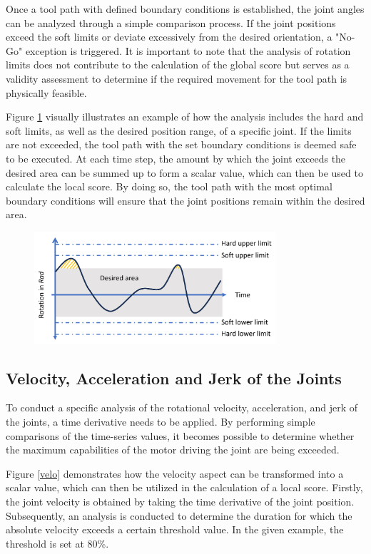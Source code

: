 Once a tool path with defined boundary conditions is established, the joint angles can be analyzed through a simple comparison process. If the joint positions exceed the soft limits or deviate excessively from the desired orientation, a "No-Go" exception is triggered. It is important to note that the analysis of rotation limits does not contribute to the calculation of the global score but serves as a validity assessment to determine if the required movement for the tool path is physically feasible.

Figure \ref{limits} visually illustrates an example of how the analysis includes the hard and soft limits, as well as the desired position range, of a specific joint. If the limits are not exceeded, the tool path with the set boundary conditions is deemed safe to be executed. At each time step, the amount by which the joint exceeds the desired area can be summed up to form a scalar value, which can then be used to calculate the local score. By doing so, the tool path with the most optimal boundary conditions will ensure that the joint positions remain within the desired area.

\begin{figure}[H]
	\centerline{\includegraphics[width=0.8\textwidth]{figures/limits.png}}
	\caption{}
	\label{limits}
\end{figure}

\subsection{Velocity, Acceleration and Jerk of the Joints}\label{VAJJ}
To conduct a specific analysis of the rotational velocity, acceleration, and jerk of the joints, a time derivative needs to be applied. By performing simple comparisons of the time-series values, it becomes possible to determine whether the maximum capabilities of the motor driving the joint are being exceeded.

Figure \ref{velo} demonstrates how the velocity aspect can be transformed into a scalar value, which can then be utilized in the calculation of a local score. Firstly, the joint velocity is obtained by taking the time derivative of the joint position. Subsequently, an analysis is conducted to determine the duration for which the absolute velocity exceeds a certain threshold value. In the given example, the threshold is set at 80\%. 

